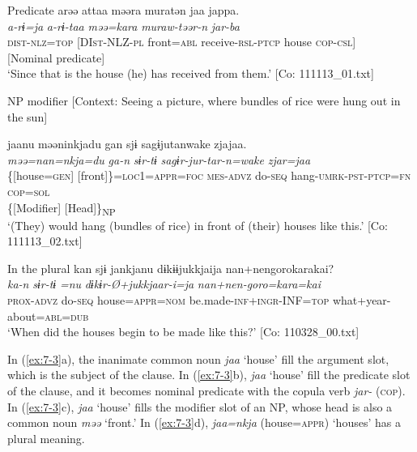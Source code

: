 \ex \label{ex:7:3b}Predicate
{\TM}
\gllll  arəə  attaa  məəra  muratən  jaa  jappa.\\
\textit{a-rɨ=ja}  \textit{a-rɨ-taa}  \textit{məə=kara}  \textit{muraw-təər-n}  \textit{}  \textit{jar-ba}\\
\textsc{dist}-\textsc{nlz}=\textsc{top}  [DI\textsc{st}-NLZ-\textsc{pl}  front=\textsc{abl}  receive-\textsc{rsl}-\textsc{ptcp}  house                               \textsc{cop}-\textsc{csl}]\\
{}[Nominal predicate]\\
\glt ‘Since that is the house (he) has received from them.’ [Co: 111113\_01.txt]

\ex \label{ex:7:3c}NP modifier
    [Context: Seeing a picture, where bundles of rice were hung out in the sun]

{\TM}
\gllll jaanu  məəninkjadu  gan  sjɨ   sagɨjutanwake  zjajaa.\\
\textit{}  \textit{məə=nan=nkja=du}  \textit{ga-n}  \textit{sɨr-tɨ} \textit{sagɨr-jur-tar-n=wake}  \textit{zjar=jaa}\\
      \{[house=\textsc{gen}]  [front]\}=\textsc{loc}1=\textsc{appr}=\textsc{foc}  \textsc{mes}-\textsc{advz}  do-\textsc{seq}                  hang-\textsc{umrk}-\textsc{pst}-\textsc{ptcp}=\textsc{fn}  \textsc{cop}=\textsc{sol}\\
      \{[Modifier]  [Head]\}\textsubscript{NP}    \\
\glt    ‘(They) would hang (bundles of rice) in front of (their) houses like this.’       [Co: 111113\_02.txt]

\ex \label{ex:7:3d}In the plural
{\TM}
\glll  kan  sjɨ  jankjanu  dɨkɨɨjukkjaija {\textbar}nan+nengoro{\textbar}karakai?\\
\textit{ka-n}  \textit{sɨr-tɨ}  \textit{=nu}  \textit{dɨkɨr-Ø+jukkjaar-i=ja}  \textit{nan+nen-goro=kara=kai}\\
\textsc{prox}-\textsc{advz}  do-\textsc{seq}  house=\textsc{appr}=\textsc{nom}  be.made-\textsc{inf}+\textsc{ingr}-INF=\textsc{top}  what+year-about=\textsc{abl}=\textsc{dub}\\
\glt ‘When did the houses begin to be made like this?’ [Co: 110328\_00.txt]

\z
\z

In (\ref{ex:7-3}a), the inanimate common noun \textit{jaa} ‘house’ fill the argument slot, which is the subject of the clause. In (\ref{ex:7-3}b), \textit{jaa} ‘house’ fill the predicate slot of the clause, and it becomes nominal predicate with the copula verb \textit{jar-} (\textsc{cop}). In (\ref{ex:7-3}c), \textit{jaa} ‘house’ fills the modifier slot of an NP, whose head is also a common noun \textit{məə} ‘front.’ In (\ref{ex:7-3}d), \textit{jaa=nkja} (house=\textsc{appr}) ‘houses’ has a plural meaning.


